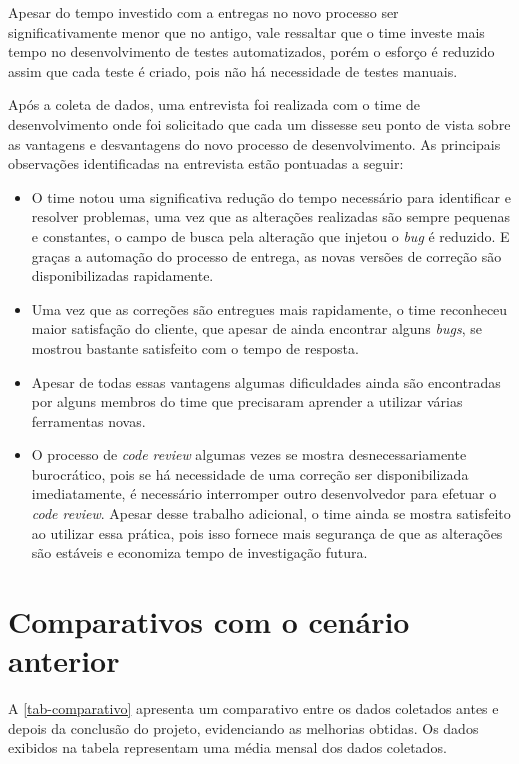 \documentclass[
	12pt,				%
	openright,			%
	oneside,			%
	a4paper,			%
	english,			%
	french,				%
	spanish,			%
	brazil,				%
	]{abntex2}
\begin{document}
Apesar do tempo investido com a entregas no novo processo ser significativamente menor que no antigo, vale ressaltar que o time investe mais tempo no desenvolvimento de testes automatizados, porém o esforço é reduzido assim que cada teste é criado, pois não há necessidade de testes manuais.

Após a coleta de dados, uma entrevista foi realizada com o time de desenvolvimento onde foi solicitado que cada um dissesse seu ponto de vista sobre as vantagens e desvantagens do novo processo de desenvolvimento. As principais observações identificadas na entrevista estão pontuadas a seguir:

\begin{itemize}  
	\item O time notou uma significativa redução do tempo necessário para identificar e resolver problemas, uma vez que as alterações realizadas são sempre pequenas e constantes, o campo de busca pela alteração que injetou o \textit{bug} é reduzido. E graças a automação do processo de entrega, as novas versões de correção são disponibilizadas rapidamente. 
	\item Uma vez que as correções são entregues mais rapidamente, o time reconheceu maior satisfação do cliente, que apesar de ainda encontrar alguns \textit{bugs}, se mostrou bastante satisfeito com o tempo de resposta.
	\item Apesar de todas essas vantagens algumas dificuldades ainda são encontradas por alguns membros do time que precisaram aprender a utilizar várias ferramentas novas.
	\item O processo de \textit{code review} algumas vezes se mostra desnecessariamente burocrático, pois se há necessidade de uma correção ser disponibilizada imediatamente, é necessário interromper outro desenvolvedor para efetuar o \textit{code review}. Apesar desse trabalho adicional, o time ainda se mostra satisfeito ao utilizar essa prática, pois isso fornece mais segurança de que as alterações são estáveis e economiza tempo de investigação futura.
\end{itemize}

\section{Comparativos com o cenário anterior}

A \autoref{tab-comparativo} apresenta um comparativo entre os dados coletados antes e depois da conclusão do projeto, evidenciando as melhorias obtidas. Os dados exibidos na tabela representam uma média mensal dos dados coletados.
\end{document}
